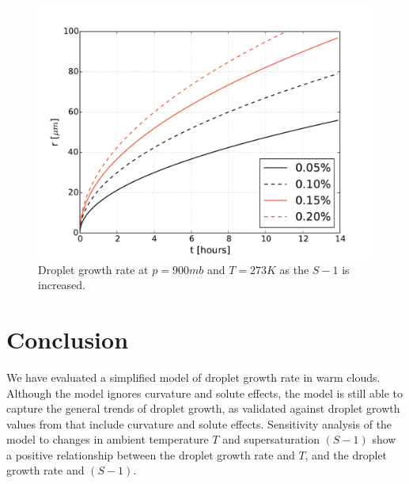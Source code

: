 \documentclass[]{article}
\begin{document}
\begin{figure}
    \centering
    \includegraphics[width=\textwidth]{r_t_supersaturation.pdf}
    \caption{Droplet growth rate at $p=900 mb$ and $T= 273 K$ as the $S - 1$ is increased.}
    \label{fig:supersaturation}
\end{figure}


\section{Conclusion}
We have evaluated a simplified model of droplet growth rate in warm clouds.
Although the model ignores curvature and solute effects, the model is still
able to capture the general trends of droplet growth, as validated against
droplet growth values from \cite{Curry, Mason, Best} that include curvature and
solute effects. Sensitivity analysis of the model to changes in ambient temperature $T$
and supersaturation $(S -1)$ show a positive relationship between the droplet growth rate
and $T$, and the droplet growth rate and $(S - 1)$.





\end{document}
